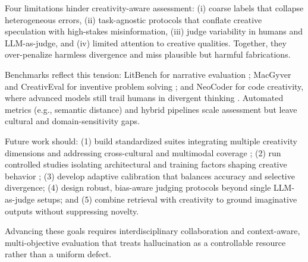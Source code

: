 \documentclass{llncs}
\begin{document}
Four limitations hinder creativity-aware assessment: (i) coarse labels that collapse heterogeneous errors, (ii) task-agnostic protocols that conflate creative speculation with high-stakes misinformation, (iii) judge variability in humans and LLM-as-judge, and (iv) limited attention to creative qualities. Together, they over-penalize harmless divergence and miss plausible but harmful fabrications.

Benchmarks reflect this tension: LitBench for narrative evaluation \cite{fein2025litbench}; MacGyver and CreativEval \cite{tian2025macgyver,delorenzo2024creativeval} for inventive problem solving ; and NeoCoder \cite{lu2025benchmarking} for code creativity, where advanced models still trail humans in divergent thinking . Automated metrics (e.g., semantic distance) and hybrid pipelines scale assessment but leave cultural and domain-sensitivity gaps.

Future work should: (1) build standardized suites integrating multiple creativity dimensions and addressing cross-cultural and multimodal coverage \cite{zhao2024assessing}; (2) run controlled studies isolating architectural and training factors shaping creative behavior \cite{jiang2024survey}; (3) develop adaptive calibration that balances accuracy and selective divergence; (4) design robust, bias-aware judging protocols beyond single LLM-as-judge setups; and (5) combine retrieval with creativity to ground imaginative outputs without suppressing novelty.

Advancing these goals requires interdisciplinary collaboration and context-aware, multi-objective evaluation that treats hallucination as a controllable resource rather than a uniform defect.



\end{document}
